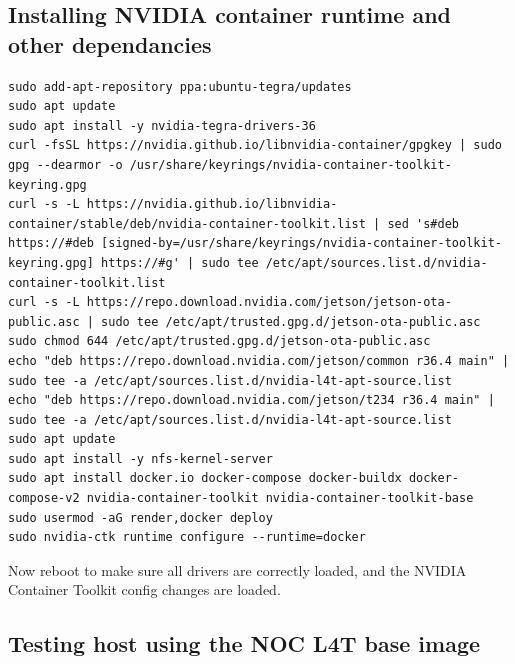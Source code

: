 \documentclass[11pt]{article}
\begin{document}
\subsection{Installing NVIDIA container runtime and other dependancies}



\lstset{style=console}
\begin{lstlisting}
sudo add-apt-repository ppa:ubuntu-tegra/updates
sudo apt update
sudo apt install -y nvidia-tegra-drivers-36
curl -fsSL https://nvidia.github.io/libnvidia-container/gpgkey | sudo gpg --dearmor -o /usr/share/keyrings/nvidia-container-toolkit-keyring.gpg
curl -s -L https://nvidia.github.io/libnvidia-container/stable/deb/nvidia-container-toolkit.list | sed 's#deb https://#deb [signed-by=/usr/share/keyrings/nvidia-container-toolkit-keyring.gpg] https://#g' | sudo tee /etc/apt/sources.list.d/nvidia-container-toolkit.list
curl -s -L https://repo.download.nvidia.com/jetson/jetson-ota-public.asc | sudo tee /etc/apt/trusted.gpg.d/jetson-ota-public.asc
sudo chmod 644 /etc/apt/trusted.gpg.d/jetson-ota-public.asc
echo "deb https://repo.download.nvidia.com/jetson/common r36.4 main" | sudo tee -a /etc/apt/sources.list.d/nvidia-l4t-apt-source.list
echo "deb https://repo.download.nvidia.com/jetson/t234 r36.4 main" | sudo tee -a /etc/apt/sources.list.d/nvidia-l4t-apt-source.list
sudo apt update
sudo apt install -y nfs-kernel-server
sudo apt install docker.io docker-compose docker-buildx docker-compose-v2 nvidia-container-toolkit nvidia-container-toolkit-base
sudo usermod -aG render,docker deploy
sudo nvidia-ctk runtime configure --runtime=docker
\end{lstlisting}

Now reboot to make sure all drivers are correctly loaded, and the NVIDIA Container Toolkit config changes are loaded.


\subsection{Testing host using the NOC L4T base image}
\end{document}
